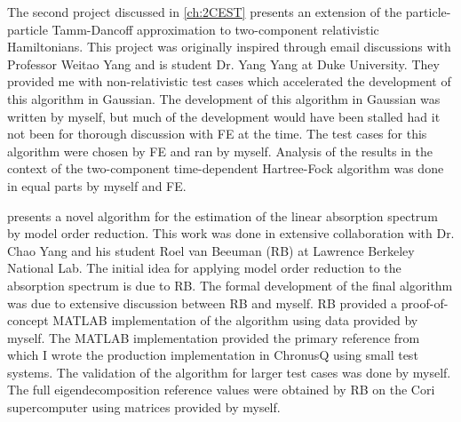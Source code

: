 {  The second project discussed in \cref{ch:2CEST} presents an extension of the particle-particle Tamm-Dancoff
  approximation to two-component relativistic Hamiltonians. This project was originally inspired through 
  email discussions with Professor Weitao Yang and is student Dr. Yang Yang at Duke University. They provided
  me with non-relativistic test cases which accelerated the development of this algorithm in Gaussian. The
  development of this algorithm in Gaussian was written by myself, but much of the development would have 
  been stalled had it not been for thorough discussion with FE at the time. The test cases for
  this algorithm were chosen by FE and ran by myself. Analysis of the results in the context of the
  two-component time-dependent Hartree-Fock algorithm was done in equal parts by myself and FE.

   presents a novel algorithm for the estimation of the linear absorption spectrum
  by model order reduction. This work was done in extensive collaboration with Dr. Chao Yang 
  and his student Roel van Beeuman (RB) at Lawrence Berkeley National Lab. The initial idea
  for applying model order reduction to the absorption spectrum is due to RB. The formal
  development of the final algorithm was due to extensive discussion between RB and myself.
  RB provided a proof-of-concept MATLAB implementation of the algorithm using data provided
  by myself. The MATLAB implementation provided the primary reference from which I wrote the 
  production implementation in ChronusQ using small test systems. The validation of the algorithm
  for larger test cases was done by myself. The full eigendecomposition reference values were
  obtained by RB on the Cori supercomputer using matrices provided by myself.
%
}


%
